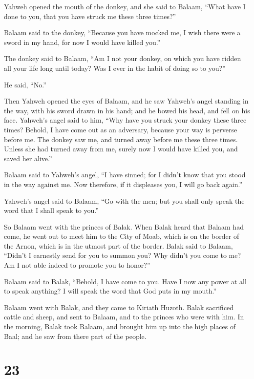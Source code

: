  Yahweh opened the mouth of the donkey, and she said to
Balaam, ``What have I done to you, that you have struck me these three
times?''

 Balaam said to the donkey, ``Because you have mocked me, I
wish there were a sword in my hand, for now I would have killed you.''

 The donkey said to Balaam, ``Am I not your donkey, on
which you have ridden all your life long until today? Was I ever in the
habit of doing so to you?''

He said, ``No.''

 Then Yahweh opened the eyes of Balaam, and he saw Yahweh's
angel standing in the way, with his sword drawn in his hand; and he
bowed his head, and fell on his face.  Yahweh's angel said
to him, ``Why have you struck your donkey these three times? Behold, I
have come out as an adversary, because your way is perverse before me.
 The donkey saw me, and turned away before me these three
times. Unless she had turned away from me, surely now I would have
killed you, and saved her alive.''

 Balaam said to Yahweh's angel, ``I have sinned; for I
didn't know that you stood in the way against me. Now therefore, if it
displeases you, I will go back again.''

 Yahweh's angel said to Balaam, ``Go with the men; but you
shall only speak the word that I shall speak to you.''

So Balaam went with the princes of Balak.  When Balak heard
that Balaam had come, he went out to meet him to the City of Moab, which
is on the border of the Arnon, which is in the utmost part of the
border.  Balak said to Balaam, ``Didn't I earnestly send
for you to summon you? Why didn't you come to me? Am I not able indeed
to promote you to honor?''

 Balaam said to Balak, ``Behold, I have come to you. Have I
now any power at all to speak anything? I will speak the word that God
puts in my mouth.''

 Balaam went with Balak, and they came to Kiriath Huzoth.
 Balak sacrificed cattle and sheep, and sent to Balaam, and
to the princes who were with him.  In the morning, Balak
took Balaam, and brought him up into the high places of Baal; and he saw
from there part of the people.

\hypertarget{section-22}{%
\section{23}\label{section-22}}

